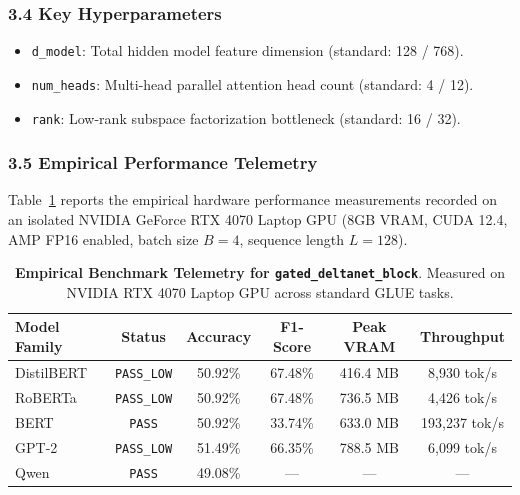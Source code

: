 \subsubsection*{3.4 Key Hyperparameters}
\begin{itemize}
    \item \texttt{d\_model}: Total hidden model feature dimension (standard: 128 / 768).
    \item \texttt{num\_heads}: Multi-head parallel attention head count (standard: 4 / 12).
    \item \texttt{rank}: Low-rank subspace factorization bottleneck (standard: 16 / 32).
\end{itemize}

\subsubsection*{3.5 Empirical Performance Telemetry}
Table~\ref{tab:telemetry_gated_deltanet_block} reports the empirical hardware performance measurements recorded on an isolated NVIDIA GeForce RTX 4070 Laptop GPU (8GB VRAM, CUDA 12.4, AMP FP16 enabled, batch size $B=4$, sequence length $L=128$).

\begin{table}[h]
\centering
\small
\caption{\textbf{Empirical Benchmark Telemetry for \texttt{gated\_deltanet\_block}}. Measured on NVIDIA RTX 4070 Laptop GPU across standard GLUE tasks.}
\label{tab:telemetry_gated_deltanet_block}
\begin{tabular*}{\columnwidth}{@{\extracolsep{\fill}}lccccc}
\toprule
\textbf{Model Family} & \textbf{Status} & \textbf{Accuracy} & \textbf{F1-Score} & \textbf{Peak VRAM} & \textbf{Throughput} \\
\midrule
DistilBERT & \texttt{PASS\_LOW} & 50.92\% & 67.48\% & 416.4 MB & 8,930 tok/s \\
RoBERTa & \texttt{PASS\_LOW} & 50.92\% & 67.48\% & 736.5 MB & 4,426 tok/s \\
BERT & \texttt{PASS} & 50.92\% & 33.74\% & 633.0 MB & 193,237 tok/s \\
GPT-2 & \texttt{PASS\_LOW} & 51.49\% & 66.35\% & 788.5 MB & 6,099 tok/s \\
Qwen & \texttt{PASS} & 49.08\% & --- & --- & --- \\
\bottomrule
\end{tabular*}
\end{table}

